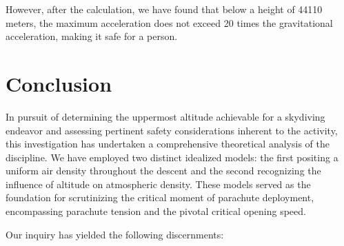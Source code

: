 \documentclass[12pt]{article}
\begin{document}
\vspace{12pt}
However, after the calculation, we have found that below a height of 44110 meters, 
the maximum acceleration does not exceed 20 times the gravitational 
acceleration, making it safe for a person.

\section{Conclusion}
In pursuit of determining the uppermost altitude achievable for a skydiving endeavor and assessing pertinent safety 
considerations inherent to the activity, this investigation has undertaken a comprehensive theoretical analysis of the 
discipline. We have employed two distinct idealized models: the first positing a uniform air density throughout the 
descent and the second recognizing the influence of altitude on atmospheric density. These models served as the foundation 
for scrutinizing the critical moment of parachute deployment, encompassing parachute tension and the pivotal critical opening speed.

Our inquiry has yielded the following discernments:
\end{document}
